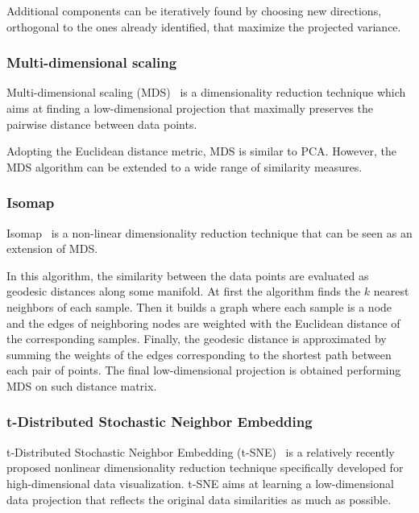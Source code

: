 	Additional components can be iteratively found by choosing new directions, orthogonal to the ones already identified, that maximize the projected variance. %
	
	\subsubsection{Multi-dimensional scaling} \label{sec:mds}

	Multi-dimensional scaling (\ac{MDS})~\cite{borg2005modern} is a dimensionality reduction technique which aims at finding a low-dimensional projection that maximally preserves the pairwise distance between data points.
		
	Adopting the Euclidean distance metric, MDS is similar to PCA. However, the MDS algorithm can be extended to a wide range of similarity measures. %
	
	\subsubsection{Isomap} \label{sec:isomap}
	
	Isomap~\cite{tenenbaum2000global} is a non-linear dimensionality reduction technique that can be seen as an extension of MDS.
	
	In this algorithm, the similarity between the data points are evaluated as geodesic distances along some manifold. At first the algorithm finds the $k$ nearest neighbors of each sample. Then it builds a graph where each sample is a node and the edges of neighboring nodes are weighted with the Euclidean distance of the corresponding samples. Finally, the geodesic distance is approximated by summing the weights of the edges corresponding to the shortest path between each pair of points. The final low-dimensional projection is obtained performing MDS on such distance matrix. %
	
	
	\subsubsection{t-Distributed Stochastic Neighbor Embedding} \label{sec:tsne}
	
	t-Distributed Stochastic Neighbor Embedding	(\ac{t-SNE})~\cite{van2008visualizing} is a relatively recently proposed nonlinear dimensionality reduction technique specifically developed for high-dimensional data visualization. t-SNE aims at learning a low-dimensional data projection that reflects the original data similarities as much as possible.
	
